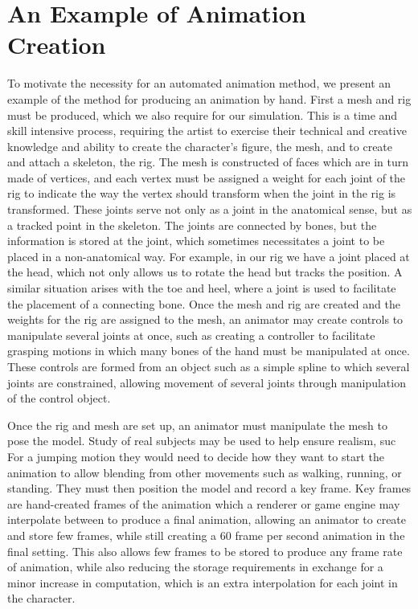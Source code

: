 
 
\section{An Example of Animation Creation}
\label{section:anim_ex}
To motivate the necessity for an automated animation method, we present an example of the method for producing an animation by hand.  First a mesh and rig must be produced, which we also require for our simulation.  This is a time and skill intensive process, requiring the artist to exercise their technical and creative knowledge and ability to create the character's figure, the mesh, and to create and attach a skeleton, the rig.  The mesh is constructed of faces which are in turn made of vertices, and each vertex must be assigned a weight for each joint of the rig to indicate the way the vertex should transform when the joint in the rig is transformed.  These joints serve not only as a joint in the anatomical sense, but as a tracked point in the skeleton.  The joints are connected by bones, but the information is stored at the joint, which sometimes necessitates a joint to be placed in a non-anatomical way.  For example, in our rig we have a joint placed at the head, which not only allows us to rotate the head but tracks the position.  A similar situation arises with the toe and heel, where a joint is used to facilitate the placement of a connecting bone.  Once the mesh and rig are created and the weights for the rig are assigned to the mesh, an animator may create controls to manipulate several joints at once, such as creating a controller to facilitate grasping motions in which many bones of the hand must be manipulated at once.  These controls are formed from an object such as a simple spline to which several joints are constrained, allowing movement of several joints through manipulation of the control object.

Once the rig and mesh are set up, an animator must manipulate the mesh to pose the model.  Study of real subjects may be used to help ensure realism, suc  For a jumping motion they would need to decide how they want to start the animation to allow blending from other movements such as walking, running, or standing.  They must then position the model and record a key frame.  Key frames are hand-created frames of the animation which a renderer or game engine may interpolate between to produce a final animation, allowing an animator to create and store few frames, while still creating a 60 frame per second animation in the final setting.  This also allows few frames to be stored to produce any frame rate of animation, while also reducing the storage requirements in exchange for a minor increase in computation, which is an extra interpolation for each joint in the character.

